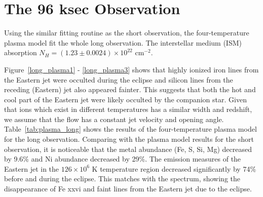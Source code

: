 \newpage
\section{The 96 ksec Observation}

Using the similar fitting routine as the short observation, the four-temperature plasma model fit the whole long observation. The interstellar medium (ISM) absorption $N_H = (1.23 \pm 0.0024) \times 10^{22}$ $\mathrm{cm^{-2}}$.\par 


Figure~\ref{long_plasma1} - \ref{long_plasma3} shows that highly ionized iron lines from the Eastern jet were occulted during the eclipse and silicon lines from the receding (Eastern) jet also appeared fainter. This suggests that both the hot and cool part of the Eastern jet were likely occulted by the companion star. Given that ions which exist in different temperatures has a similar width and redshift, we assume that the flow has a constant jet velocity and opening angle. 
Table~\ref{tab:plasma_long} shows the results of the four-temperature plasma model for the long observation. Comparing with the plasma model results for the short observation, it is noticeable that the metal abundance (Fe, S, Si, Mg) decreased by 9.6\% and Ni abundance decreased by 29\%. The emission measures of the Eastern jet in the $126 \times 10^6$ K temperature region decreased significantly by 74\% before and during the eclipse. This matches with the spectrum, showing the disappearance of Fe {\sc xxvi} and faint lines from the Eastern jet due to the eclipse. 









